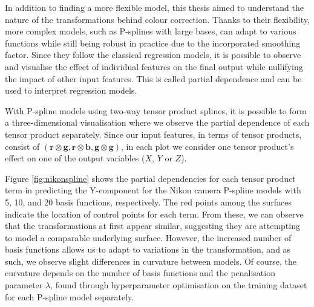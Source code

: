 In addition to finding a more flexible model, this thesis aimed to understand the nature of the transformations behind colour correction. Thanks to their flexibility, more complex models, such as P-splines with large bases, can adapt to various functions while still being robust in practice due to the incorporated smoothing factor. Since they follow the classical regression models, it is possible to observe and visualise the effect of individual features on the final output while nullifying the impact of other input features. This is called partial dependence and can be used to interpret regression models.

With P-spline models using two-way tensor product splines, it is possible to form a three-dimensional visualisation where we observe the partial dependence of each tensor product separately. Since our input features, in terms of tensor products, consist of $(\mathbf{r} \otimes \mathbf{g}, \mathbf{r} \otimes \mathbf{b}, \mathbf{g} \otimes \mathbf{g})$, in each plot we consider one tensor product's effect on one of the output variables ($X$, $Y$ or $Z$).


Figure \ref{fig:nikonspline} shows the partial dependencies for each tensor product term in predicting the Y-component for the Nikon camera P-spline models with 5, 10, and 20 basis functions, respectively. The red points among the surfaces indicate the location of control points for each term. From these, we can observe that the transformations at first appear similar, suggesting they are attempting to model a comparable underlying surface. However, the increased number of basis functions allows us to adapt to variations in the transformation, and as such, we observe slight differences in curvature between models. Of course, the curvature depends on the number of basis functions and the penalisation parameter $\lambda$, found through hyperparameter optimisation on the training dataset for each P-spline model separately. 

